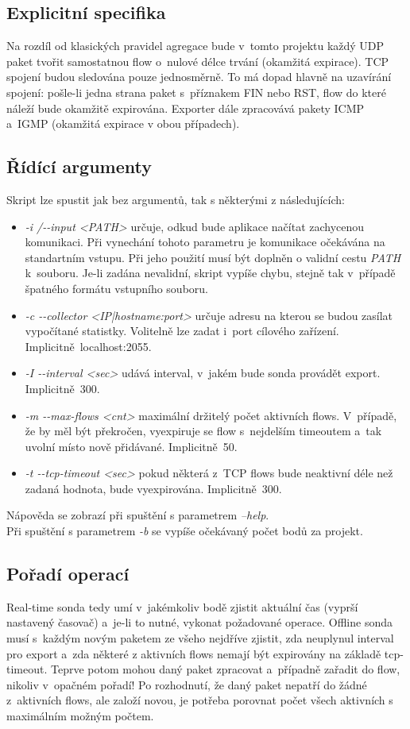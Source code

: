 \documentclass[12pt,a4paper,titlepage]{extarticle}
\begin{document}
\subsection{Explicitní specifika}
Na rozdíl od klasických pravidel agregace bude v~tomto projektu každý UDP paket tvořit samostatnou flow o~nulové délce trvání (okamžitá expirace). TCP spojení budou sledována pouze jednosměrně. To má dopad hlavně na uzavírání spojení: pošle-li jedna strana paket s~příznakem FIN nebo RST, flow do které náleží bude okamžitě expirována. Exporter dále zpracovává pakety ICMP a~IGMP (okamžitá expirace v obou případech).

\subsection{Řídící argumenty}
Skript lze spustit jak bez argumentů, tak s některými z následujících:
	\begin{itemize}[noitemsep,nolistsep]
	\item \emph{-i /-\--input <PATH>} určuje, odkud bude aplikace načítat zachycenou komunikaci. Při vynechání tohoto parametru je komunikace očekávána na standartním vstupu. Při jeho použití musí být doplněn o validní cestu \emph{PATH} k~souboru. Je-li zadána nevalidní, skript vypíše chybu, stejně tak v~případě špatného formátu vstupního souboru.	
	\item \emph{-c -\--collector <IP|hostname:port>} určuje adresu na kterou se budou zasílat vypočítané statistky. Volitelně lze zadat i~port cílového zařízení. Implicitně~localhost:2055.
	\item \emph{-I -\--interval <sec>} udává interval, v~jakém bude sonda provádět export. Implicitně~300.
	\item \emph{-m -\--max-flows <cnt>} maximální držitelý počet aktivních flows. V~případě, že by měl být překročen, vyexpiruje se flow s~nejdelším timeoutem a~tak uvolní místo nově přidávané. Implicitně~50.
	\item \emph{-t -\--tcp-timeout <sec>} pokud některá z~TCP flows bude neaktivní déle než zadaná hodnota, bude vyexpirována. Implicitně~300. 
	\end{itemize}
\noindent Nápověda se zobrazí při spuštění s parametrem \emph{--help}.\\Při spuštění s parametrem \emph{-b} se vypíše očekávaný počet bodů za projekt.

\subsection{Pořadí operací}
Real-time sonda tedy umí v~jakémkoliv bodě zjistit aktuální čas (vyprší nastavený časovač) a~je-li to nutné, vykonat požadované operace. Offline sonda musí s~každým novým paketem ze všeho nejdříve zjistit, zda neuplynul interval pro export a~zda některé z aktivních flows nemají být expirovány na základě tcp-timeout. Teprve potom mohou daný paket zpracovat a~případně zařadit do flow, nikoliv v~opačném pořadí! Po rozhodnutí, že daný paket nepatří do žádné z~aktivních flows, ale založí novou, je potřeba porovnat počet všech aktivních s maximálním možným počtem.
\end{document}
